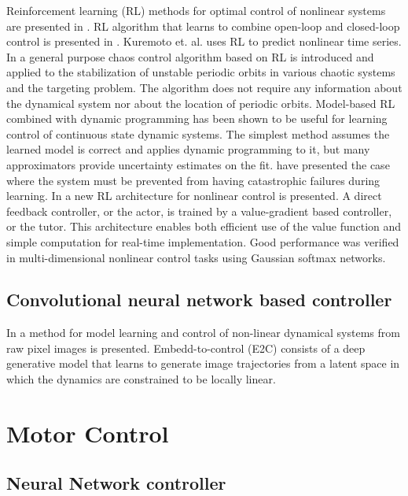 \documentclass[conference]{IEEEtran}
\begin{document}
Reinforcement learning (RL) methods for optimal control of nonlinear systems are presented in \cite{HBZnips96, takashi2005nonlinear, sabino1999chaos, schnider1997nips, doya1996nips}. RL algorithm that learns to combine open-loop and closed-loop control is presented in \cite{HBZnips96}. Kuremoto et. al. \cite{takashi2005nonlinear} uses RL to predict nonlinear time series. In \cite{sabino1999chaos} a general purpose chaos control algorithm based on RL is introduced and applied to the stabilization of unstable periodic orbits in various chaotic systems and the targeting problem. The algorithm does not require any information about the dynamical system nor about the location of periodic orbits. Model-based RL combined with dynamic programming has been shown to be useful for learning control of continuous state dynamic systems. The simplest method assumes the learned model is correct and applies dynamic programming to it, but many approximators provide uncertainty estimates on the fit. \cite{schnider1997nips} have presented the case where the system must be prevented from having catastrophic failures during learning. In \cite{doya1997nips} a new RL architecture for nonlinear control is presented. A direct feedback controller, or the actor, is trained by a value-gradient based controller, or the tutor. This architecture enables both efficient use of the value function and simple computation for real-time implementation. Good performance was verified in multi-dimensional nonlinear control tasks using Gaussian softmax networks.

\subsection{\textbf{Convolutional neural network based controller}}

In \cite{watter2015nips} a method for model learning and control of non-linear dynamical systems from raw pixel images is presented. Embedd-to-control (E2C) consists of a deep generative model that learns to generate image trajectories from a latent space in which the dynamics are constrained to be locally linear. \\

\section{Motor Control}

\subsection{\textbf{Neural Network controller}}
\end{document}
